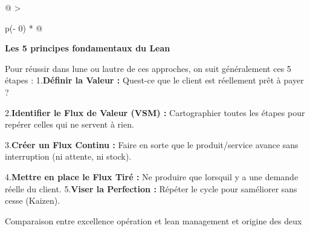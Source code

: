 \documentclass[
]{article}
\begin{document}
\begin{longtable}[]{@{}
  >{\raggedright\arraybackslash}p{(\columnwidth - 0\tabcolsep) * }@{}}
\toprule\noalign{}
\begin{minipage}[b]{\linewidth}\raggedright
\begin{center}
\end{center}

\begin{center}
\end{center}

\textbf{Les 5 principes fondamentaux du Lean}

Pour réussir dans l\textquotesingle une ou l\textquotesingle autre de
ces approches, on suit généralement ces 5 étapes : 1.\textbf{Définir la
Valeur :} Qu\textquotesingle est-ce que le client est réellement prêt à
payer ?

2.\textbf{Identifier le Flux de Valeur (VSM) :} Cartographier toutes les
étapes pour repérer celles qui ne servent à rien.

3.\textbf{Créer un Flux Continu :} Faire en sorte que le produit/service
avance sans interruption (ni attente, ni stock).

4.\textbf{Mettre en place le Flux Tiré :} Ne produire que
lorsqu\textquotesingle il y a une demande réelle du client.
5.\textbf{Viser la Perfection :} Répéter le cycle pour
s\textquotesingle améliorer sans cesse (Kaizen).

Comparaison entre excellence opération et lean management et origine des
deux


\end{minipage}
\end{longtable}
\end{document}
